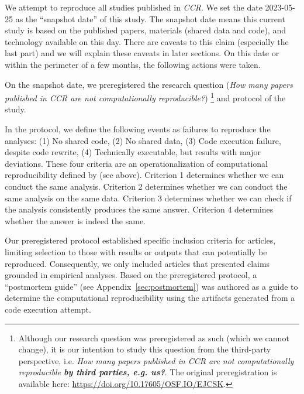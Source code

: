 We attempt to reproduce all studies published in \textit{CCR}. We set the date 2023-05-25 as the ``snapshot date'' of this study. The snapshot date means this current study is based on the published papers, materials (shared data and code), and technology available on this day. There are caveats to this claim (especially the last part) and we will explain these caveats in later sections. On this date or within the perimeter of a few months, the following actions were taken.


On the snapshot date, we preregistered the research question (\textit{How many papers published in \textit{CCR} are not computationally reproducible?}) \footnote{Although our research question was preregistered as such (which we cannot change), it is our intention to study this question from the third-party perspective, i.e. \textit{How many papers published in \textit{CCR} are not computationally reproducible \textbf{by third parties, e.g. us?}}. The original preregistration is available here: \url{https://doi.org/10.17605/OSF.IO/EJCSK}.} and protocol of the study.

In the protocol, we define the following events as failures to reproduce the analyses: (1) No shared code, (2) No shared data, (3) Code execution failure, despite code rewrite, (4) Technically executable, but results with major deviations. These four criteria are an operationalization of computational reproducibility defined by \textcite{The_Turing_Way:2022,schoch:2023:CRC,broman2017recommendations} (see above). Criterion 1 determines whether we can conduct the same analysis. Criterion 2 determines whether we can conduct the same analysis on the same data. Criterion 3 determines whether we can check if the analysis consistently produces the same answer. Criterion 4 determines whether the answer is indeed the same.

Our preregistered protocol established specific inclusion criteria for articles, limiting selection to those with results or outputs that can potentially be reproduced. 
Consequently, we only included articles that presented claims grounded in empirical analyses.
Based on the preregistered protocol, a ``postmortem guide'' (see Appendix~\ref{sec:postmortem}) was authored as a guide to determine the computational reproducibility using the artifacts generated from a code execution attempt.

